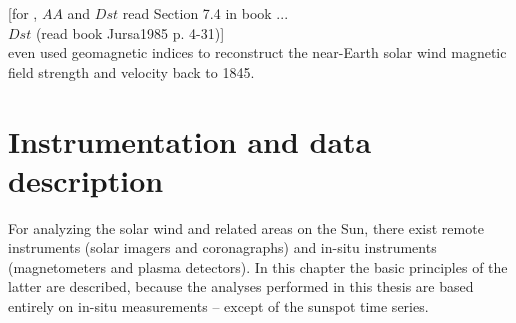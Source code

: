 [for \Kp{}, $AA$ and $Dst$ read Section 7.4 in book \citet{Bothmer2007}...\\
$Dst$ (read book Jursa1985 p. 4-31)]\\

\citet{Lockwood2014} even used geomagnetic indices to reconstruct the near-Earth solar wind magnetic field strength and velocity back to 1845.\\






\chapter{Instrumentation and data description}
\label{chap:data}
For analyzing the solar wind and related areas on the Sun, there exist remote instruments (solar imagers and coronagraphs) and in-situ instruments (magnetometers and plasma detectors). In this chapter the basic principles of the latter are described, because the analyses performed in this thesis are based entirely on in-situ measurements -- except of the sunspot time series.

